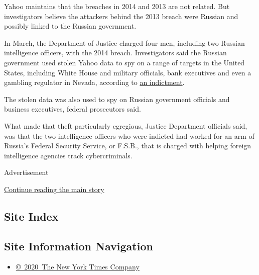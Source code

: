 Yahoo maintains that the breaches in 2014 and 2013 are not related. But
investigators believe the attackers behind the 2013 breach were Russian
and possibly linked to the Russian government.

In March, the Department of Justice charged four men, including two
Russian intelligence officers, with the 2014 breach. Investigators said
the Russian government used stolen Yahoo data to spy on a range of
targets in the United States, including White House and military
officials, bank executives and even a gambling regulator in Nevada,
according to
\href{https://www.justice.gov/opa/pr/us-charges-russian-fsb-officers-and-their-criminal-conspirators-hacking-yahoo-and-millions}{an
indictment}.

The stolen data was also used to spy on Russian government officials and
business executives, federal prosecutors said.

What made that theft particularly egregious, Justice Department
officials said, was that the two intelligence officers who were indicted
had worked for an arm of Russia's Federal Security Service, or F.S.B.,
that is charged with helping foreign intelligence agencies track
cybercriminals.

Advertisement

\protect\hyperlink{after-bottom}{Continue reading the main story}

\hypertarget{site-index}{%
\subsection{Site Index}\label{site-index}}

\hypertarget{site-information-navigation}{%
\subsection{Site Information
Navigation}\label{site-information-navigation}}

\begin{itemize}
\tightlist
\item
  \href{https://help.nytimes.com/hc/en-us/articles/115014792127-Copyright-notice}{©~2020~The
  New York Times Company}
\end{itemize}

